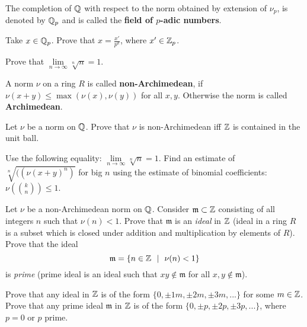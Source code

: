 \documentclass[12pt]{article}
\begin{document}
\begin{opredelenie} The completion of  ${\mathbb Q}$ with respect to the norm
  obtained by extension of $\nu_p$, is denoted by ${\mathbb Q}_p$ and is called
the   {\bf field of $p$-adic numbers}.
\end{opredelenie}

\begin{zadacha}[*] Take $x\in {\mathbb Q}_p$. Prove that 
$x = \frac {x'}{p^k}$, where $x'\in {\mathbb Z}_p$.
\end{zadacha}

\begin{zadacha}[*]
Prove that $\lim\limits_{n\to \infty} \sqrt[n]{n}=1$.
\end{zadacha}

\begin{opredelenie} A norm $\nu$ on a ring $R$ is called
{\bf non-Archimedean}, if $\nu (x+y) \leq \max (\nu(x), \nu(y))$
for all $x,y$. Otherwise the norm is called {\bf Archimedean}.
\end{opredelenie}

\begin{zadacha}[*] Let $\nu$ be a norm on ${\mathbb Q}$.  Prove that $\nu$ is
  non-Archimedean iff ${\mathbb Z}$ is contained in the unit ball.
\end{zadacha}

\begin{ukazanie} Use the following equality: 
$\lim\limits_{n\to \infty} \sqrt[n]{n}=1$.
Find an estimate of $\sqrt[n]{((\nu(x+y)^n)}$ for big $n$ using the
estimate of binomial coefficients: $\nu(\binom{k}{n})\leq 1$.
\end{ukazanie}

\begin{zadacha}[*] Let $\nu$ be a non-Archimedean norm on ${\mathbb Q}$.
Consider ${\mathfrak m} \subset {\mathbb Z}$ consisting of all
integers $n$ such that $\nu(n)<1$. 
Prove that $\mathfrak m$ is an {\em ideal} in ${\mathbb Z}$
(ideal in a ring $R$ is a subset which is closed under addition and
multiplication by elements of $R$). Prove that the ideal
$$
{\mathfrak m} = \{ n\in {\mathbb Z} \ \ | \ \ \nu(n)<1\}
$$
is {\em prime} (prime ideal is an ideal such that $xy \notin
{\mathfrak m}$ for all $x, y \notin {\mathfrak m}$). 
\end{zadacha}

\begin{zadacha}[*] Prove that any ideal in ${\mathbb Z}$ 
is of the form  $\{0, \pm1 m, \pm 2m, \pm3m, ...\}$ for some $m\in {\mathbb Z}$.
Prove that any prime ideal  ${\mathfrak m}$ 
in ${\mathbb Z}$ is of the form $\{0, \pm p, \pm 2p, \pm3p, ...\}$, where $p=0$
or $p$ prime.
\end{zadacha}
\end{document}
